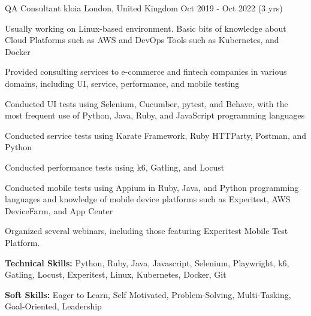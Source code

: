 \begin{cventries}
  \cventry
    {QA Consultant} %
    {kloia} %
    {London, United Kingdom} %
    {Oct 2019 - Oct 2022 (3 yrs)} %
    {
      \begin{cvitems} %
        \item {Usually working on Linux-based environment. Basic bits of knowledge about Cloud Platforms such as AWS and DevOps Tools such as Kubernetes, and Docker}
        \item {Provided consulting services to e-commerce and fintech companies in various domains, including UI, service, performance, and mobile testing}
        \item {Conducted UI tests using Selenium, Cucumber, pytest, and Behave, with the most frequent use of Python, Java, Ruby, and JavaScript programming languages}
        \item {Conducted service tests using Karate Framework, Ruby HTTParty, Postman, and Python}
        \item {Conducted performance tests using k6, Gatling, and Locust}
        \item {Conducted mobile tests using Appium in Ruby, Java, and Python programming languages and knowledge of mobile device platforms such as Experitest, AWS DeviceFarm, and App Center}
        \item {Organized several webinars, including those featuring Experitest Mobile Test Platform.}
        \item {\textbf{Technical Skills:} Python, Ruby, Java, Javascript, Selenium, Playwright, k6, Gatling, Locust, Experitest, Linux, Kubernetes, Docker, Git}
        \item {\textbf{Soft Skills:} Eager to Learn, Self Motivated, Problem-Solving, Multi-Tasking, Goal-Oriented, Leadership}
      \end{cvitems}
    }


\end{cventries}
